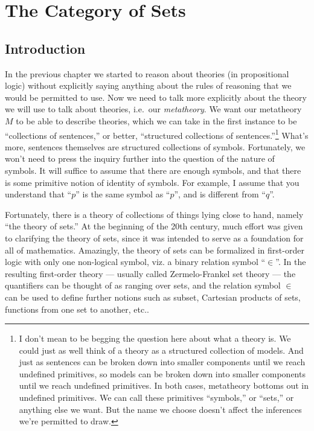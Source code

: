 

\chapter{The Category of Sets} \label{cat-set}


\section{Introduction}

In the previous chapter we started to reason about theories (in
propositional logic) without explicitly saying anything about the
rules of reasoning that we would be permitted to use.  Now we need to
talk more explicitly about the theory we will use to talk about
theories, i.e.\ our {\it metatheory}.  We want our metatheory $M$ to
be able to describe theories, which we can take in the first instance
to be ``collections of sentences,'' or better, ``structured
collections of sentences.''\footnote{I don't mean to be begging the
  question here about what a theory is.  We could just as well think
  of a theory as a structured collection of models.  And just as
  sentences can be broken down into smaller components until we reach
  undefined primitives, so models can be broken down into smaller
  components until we reach undefined primitives.  In both cases,
  metatheory bottoms out in undefined primitives.  We can call these
  primitives ``symbols,'' or ``sets,'' or anything else we want.  But
  the name we choose doesn't affect the inferences we're permitted to
  draw.}  What's more, sentences themselves are structured collections
of symbols.  Fortunately, we won't need to press the inquiry further
into the question of the nature of symbols.  It will suffice to assume
that there are enough symbols, and that there is some primitive notion
of identity of symbols.  For example, I assume that you understand
that ``$p$'' is the same symbol as ``$p$'', and is different from
``$q$''.

Fortunately, there is a theory of collections of things lying close to
hand, namely ``the theory of sets.''  At the beginning of the 20th
century, much effort was given to clarifying the theory of sets, since
it was intended to serve as a foundation for all of mathematics.
Amazingly, the theory of sets can be formalized in first-order logic
with only one non-logical symbol, viz. a binary relation symbol
``$\in$''.  In the resulting first-order theory --- usually called
Zermelo-Frankel set theory --- the quantifiers can be thought of as
ranging over sets, and the relation symbol $\in$ can be used to define
further notions such as subset, Cartesian products of sets, functions
from one set to another, etc..

